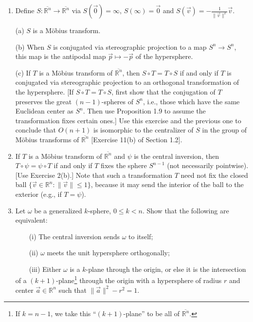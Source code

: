\documentclass[leqno]{book}
\begin{document}
\begin{enumerate}
(b) Show by example that a M\"obius transform of $\overline{\mathbb R^n}$ need not be conjugated to an orthogonal transformation.

\item Define $S:\overline{\mathbb R^n}\to\overline{\mathbb R^n}$ via $S(\vec 0)=\infty$, $S(\infty)=\vec 0$ and $S(\vec v)=-\frac 1{\|\vec v\|^2}\vec v$.

(a) $S$ is a M\"obius transform.

(b) When $S$ is conjugated via stereographic projection to a map $S^n\to S^n$, this map is the antipodal map $\vec p\mapsto -\vec p$ of the hypersphere. %

(c) If $T$ is a M\"obius transform of $\overline{\mathbb R^n}$, then $S\circ T=T\circ S$ if and only if $T$ is conjugated via stereographic projection to an orthogonal transformation of the hypersphere.  [If $S\circ T=T\circ S$, first show that the conjugation of $T$ preserves the great $(n-1)$-spheres of $S^n$, i.e., those which have the same Euclidean center as $S^n$.  Then use Proposition 1.9 to assume the transformation fixes certain ones.]  Use this exercise and the previous one to conclude that $O(n+1)$ is isomorphic to the centralizer of $S$ in the group of M\"obius transforms of $\overline{\mathbb R^n}$ [Exercise 11(b) of Section 1.2].

\item If $T$ is a M\"obius transform of $\overline{\mathbb R^n}$ and $\psi$ is the central inversion, then $T\circ\psi=\psi\circ T$ if and only if $T$ fixes the sphere $S^{n-1}$ (not necessarily pointwise).  [Use Exercise 2(b).]  Note that such a transformation $T$ need not fix the closed ball $\{\vec v\in\mathbb R^n:\|\vec v\|\leqslant 1\}$, because it may send the interior of the ball to the exterior (e.g., if $T=\psi$).

\item Let $\omega$ be a generalized $k$-sphere, $0\leqslant k<n$.  Show that the following are equivalent:

~~~~(i) The central inversion sends $\omega$ to itself;

~~~~(ii) $\omega$ meets the unit hypersphere orthogonally;

~~~~(iii) Either $\omega$ is a $k$-plane through the origin, or else it is the intersection of a $(k+1)$-plane\footnote{If $k=n-1$, we take this ``$(k+1)$-plane'' to be all of $\overline{\mathbb R^n}$.} through the origin with a hypersphere of radius $r$ and center $\vec a\in\mathbb R^n$ such that $\|\vec a\|^2-r^2=1$.


\end{enumerate}
\end{document}
